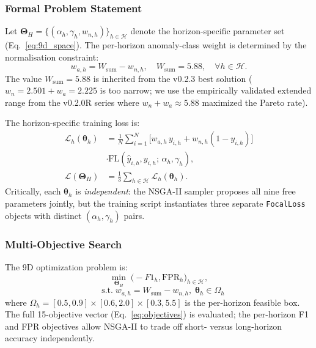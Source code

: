﻿\documentclass[twocolumn]{article}
\begin{document}
\subsubsection{Formal Problem Statement}

Let $\boldsymbol{\Theta}_H = \{(\alpha_h,\gamma_h,w_{n,h})\}_{h\in\mathcal{H}}$
denote the horizon-specific parameter set (Eq.~\ref{eq:9d_space}).
The per-horizon anomaly-class weight is determined by the
normalisation constraint:
\begin{equation}
  w_{a,h} = W_\mathrm{sum} - w_{n,h}, \quad W_\mathrm{sum} = 5.88,
  \quad \forall h\in\mathcal{H}.
  \label{eq:wsum}
\end{equation}
The value $W_\mathrm{sum}=5.88$ is inherited from the v0.2.3 best
solution ($w_n{=}2.501+w_a{=}2.225$ is too narrow; we use the
empirically validated extended range from the v0.2.0R series
where $w_n + w_a \approx 5.88$ maximized the Pareto rate).

The horizon-specific training loss is:
\begin{align}
  \mathcal{L}_h(\boldsymbol{\theta}_h)
  &= \frac{1}{N}\sum_{i=1}^{N}
    \bigl[w_{a,h}\,y_{i,h} + w_{n,h}(1-y_{i,h})\bigr]\\
  &\cdot \mathrm{FL}\!\left(\hat{y}_{i,h}, y_{i,h};\,
    \alpha_h, \gamma_h\right),
  \label{eq:horizon_loss_full}\\
  \mathcal{L}(\boldsymbol{\Theta}_H)
  &= \frac{1}{3}\sum_{h\in\mathcal{H}}\mathcal{L}_h(\boldsymbol{\theta}_h).
  \label{eq:total_9d}
\end{align}
Critically, each $\boldsymbol{\theta}_h$ is \emph{independent}:
the NSGA-II sampler proposes all nine free parameters jointly,
but the training script instantiates three separate \texttt{FocalLoss}
objects with distinct $(\alpha_h,\gamma_h)$ pairs.

\subsubsection{Multi-Objective Search}

The 9D optimization problem is:
\begin{equation}
  \min_{\boldsymbol{\Theta}_H}\;\bigl(
    -F1_h, \mathrm{FPR}_h
  \bigr)_{h\in\mathcal{H}},
\end{equation}
\begin{equation}
  \quad
  \text{s.t.}\;
  w_{a,h} = W_\mathrm{sum} - w_{n,h},\;
  \boldsymbol{\theta}_h\in\Omega_h
  \label{eq:9d_mop}
\end{equation}
where $\Omega_h = [0.5,0.9]\times[0.6,2.0]\times[0.3,5.5]$ is the
per-horizon feasible box.
The full 15-objective vector (Eq.~\ref{eq:objectives}) is evaluated;
the per-horizon F1 and FPR objectives allow NSGA-II to trade off
short- versus long-horizon accuracy independently.
\end{document}
